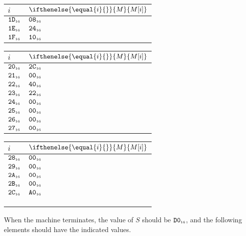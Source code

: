 \documentclass[a4paper,12pt]{article}
\makeatletter
\newcommand{\num}[1]{\texttt{#1}}
\newcommand{\hex}[1]{\num{#1}_{\textup{\tiny 16}}}
\newcommand{\MEM}[1]{\ifthenelse{\equal{#1}{}}{M}{M[#1]}}
\newcommand{\SP}{S}
\newenvironment{memtable}{%
  \begin{trivlist}
    \item
    }{%
    \end{trivlist}}
\newenvironment{memcolumn}{%
  \begin{tabular}{@{}ll@{}}
    $i$ & $\MEM{i}$ \\
    \hline}
    {%
    \hline
  \end{tabular}}
\newcommand{\memspace}{\qquad}
\makeatother
\begin{document}
\begin{memtable}
\begin{memcolumn}
    $\hex{1D}$ & $\hex{08}$ \\
    $\hex{1E}$ & $\hex{24}$ \\
    $\hex{1F}$ & $\hex{10}$ \\
  \end{memcolumn}
  \memspace
  \begin{memcolumn}
    $\hex{20}$ & $\hex{2C}$ \\
    $\hex{21}$ & $\hex{00}$ \\
    $\hex{22}$ & $\hex{40}$ \\
    $\hex{23}$ & $\hex{22}$ \\
    $\hex{24}$ & $\hex{00}$ \\
    $\hex{25}$ & $\hex{00}$ \\
    $\hex{26}$ & $\hex{00}$ \\
    $\hex{27}$ & $\hex{00}$ \\
  \end{memcolumn}
  \memspace
  \begin{memcolumn}
    $\hex{28}$ & $\hex{00}$ \\
    $\hex{29}$ & $\hex{00}$ \\
    $\hex{2A}$ & $\hex{00}$ \\
    $\hex{2B}$ & $\hex{00}$ \\
    $\hex{2C}$ & $\hex{A0}$ \\
    \\
    \\
    \\
  \end{memcolumn}
\end{memtable}
When the machine terminates, the value of $\SP$ should be $\hex{D0}$, and the following elements should have the indicated values.
\end{document}
